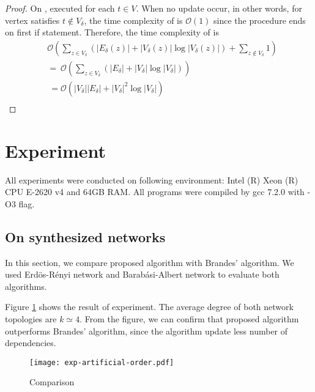 \documentclass[twocolumn]{article}
\begin{document}
\begin{proof}
    On ,  executed for each $t\in V$.
    When no update occur, in other words, for vertex satisfies $t\notin V_\delta$,
    the time complexity of  is $\mathcal{O}(1)$ since the procedure ends on first if statement.
    Therefore, the time complexity of  is
    \begin{equation*}
      \begin{aligned}
        &\mathcal{O}(
        \sum_{z\in V_\delta}(\lvert E_\delta(z)\rvert+\lvert V_\delta(z)\rvert\log\lvert V_\delta(z)\rvert)
        +\sum_{z\notin V_\delta}1) \nonumber\\
        &=\:\mathcal{O}(\sum_{z\in V_\delta}(\lvert E_\delta\rvert
        +\lvert V_\delta\rvert\log\lvert V_\delta\rvert))\nonumber\\
        &\:=\mathcal{O}(\lvert V_\delta\rvert\lvert E_\delta\rvert
        +\lvert V_\delta\rvert^2\log\lvert V_\delta\rvert) \nonumber\\
      \end{aligned}
    \end{equation*}
  \end{proof}

  \section{Experiment}
  All experiments were conducted on following environment: Intel (R) Xeon (R) CPU E-2620 v4 and 64GB RAM. All programs were compiled by gcc 7.2.0 with -O3 flag.

  \subsection*{On synthesized networks}
  In this section, we compare proposed algorithm with Brandes' algorithm.
  We used Erd{\"{o}}s-R{\'{e}}nyi network\cite{Erdos1959} and Barab{\'{a}}si-Albert network\cite{Barabasi1999} to evaluate both algorithms.

  Figure \ref{fig:exp-artificial-order} shows the result of experiment.
  The average degree of both network topologies are $k\simeq4$.
  From the figure, we can confirm that proposed algorithm outperforms Brandes' algorithm, since the algorithm update less number of dependencies.

  \begin{figure}
    \centering
    \texttt{[image: exp-artificial-order.pdf]}
    \caption{Comparison}
    \label{fig:exp-artificial-order}
  \end{figure}
\end{document}
